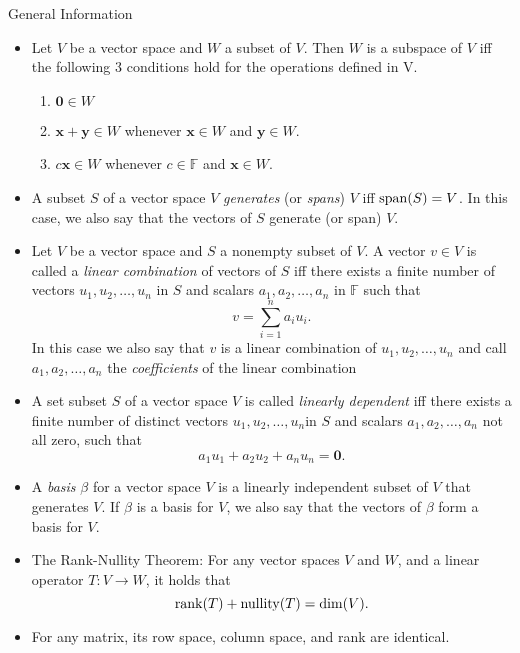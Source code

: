 \documentclass[../Notes.tex]{subfiles}
\begin{document}
    \begin{stbox}{General Information}
        \begin{itemize}
            \item  Let \(V\) be a vector space and \(W\) a subset of \(V\). Then \(W\) is a subspace of \(V\) iff the following 3 conditions hold for the operations defined in V.
            \begin{enumerate}[label=(\alph*)]
                \item \(\mathbf{0} \in W\) \label{Theorem 1.3(a)}
                \item \(\mathbf{x}+\mathbf{y} \in W\) whenever \(\mathbf{x} \in W\) and \(\mathbf{y} \in W\). \label{Theorem 1.3(b)}
                \item \(c\mathbf{x} \in W\) whenever \(c \in \mathbb{F}\) and \(\mathbf{x} \in W\). \label{Theorem 1.3(c)}
            \end{enumerate}
            \item A subset \(S\) of a vector space \(V\) \emph{generates} (or \emph{spans}) \(V\) iff \(\operatorname{span}(S)=V\). In this case, we also say that the vectors of \(S\) generate (or span) \(V\).
            \item Let \(V\) be a vector space and \(S\) a nonempty subset of \(V\). A vector \(v \in V\) is called a \emph{linear combination} of vectors of \(S\) iff there exists a finite number of vectors \(u_1,u_2,\dots,u_n\) in \(S\) and scalars \(a_1,a_2,\dots,a_n\) in \(\mathbb{F}\) such that
            \[v=\sum_{i=1}^{n}{a_iu_i}.\]
            In this case we also say that \(v\) is a linear combination of \(u_1,u_2,\dots,u_n\) and call \(a_1,a_2,\dots,a_n\) the \emph{coefficients} of the linear combination
            \item A set subset \(S\) of a vector space \(V\) is called \emph{linearly dependent} iff there exists a finite number of distinct vectors \(u_1,u_2,\dots,u_n\)in \(S\) and scalars \(a_1,a_2,\dots,a_n\) not all zero, such that
            \[a_1u_1+a_2u_2+a_nu_n=\mathbf{0}.\]
            \item A \emph{basis} \(\beta\) for a vector space \(V\) is a linearly independent subset of \(V\) that generates \(V\). If \(\beta\) is a basis for \(V\), we also say that the vectors of \(\beta\) form a basis for \(V\).
            \item The Rank-Nullity Theorem: For any vector spaces \(V\) and \(W\), and a linear operator \(T \colon V \to W\), it holds that
            \[\operatorname{rank}(T)+\operatorname{nullity}(T)=\dim(V).\]
            \item For any matrix, its row space, column space, and rank are identical.

\end{itemize}
\end{stbox}
\end{document}
